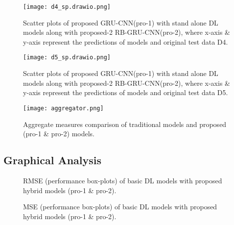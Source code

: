    \begin{figure*}[h!]
    \centering
     \texttt{[image: d4\_sp.drawio.png]}
     \caption{Scatter plots of proposed GRU-CNN(pro-1) with stand alone DL models along with proposed-2 RB-GRU-CNN(pro-2), where x-axis \& y-axis represent the predictions of models and original test data D4.}
     \label{Fig:9}
   \end{figure*}
   \begin{figure}[h!]
    \centering
     \texttt{[image: d5\_sp.drawio.png]}
     \caption{Scatter plots of proposed GRU-CNN(pro-1) with stand alone DL models along with proposed-2 RB-GRU-CNN(pro-2), where x-axis \& y-axis represent the predictions of models and original test data D5.}
     \label{Fig:10}
   \end{figure}

   \begin{figure*}[h!]
    \centering
     \texttt{[image: aggregator.png]}
     \caption{Aggregate measures comparison of traditional models and proposed (pro-1 \& pro-2) models.}
     \label{Fig:13}
   \end{figure*} 
\subsection{Graphical Analysis}
 \begin{figure*}[h!]
    \centering
    \caption{RMSE (performance box-plots) of basic DL models with proposed hybrid models (pro-1 \& pro-2).}
    \label{Fig:14}
  \end{figure*}

  \begin{figure*}[h!]
    \centering
    \caption{MSE (performance box-plots) of basic DL models with proposed hybrid models (pro-1 \& pro-2).}
    \label{Fig:15}
  \end{figure*}


